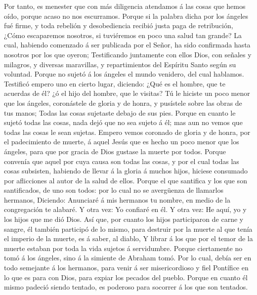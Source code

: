  Por tanto, es menester que con más diligencia atendamos á
las cosas que hemos oído, porque acaso no nos escurramos. 
Porque si la palabra dicha por los ángeles fué firme, y toda rebelión y
desobediencia recibió justa paga de retribución,  ¿Cómo
escaparemos nosotros, si tuviéremos en poco una salud tan grande? La
cual, habiendo comenzado á ser publicada por el Señor, ha sido
confirmada hasta nosotros por los que oyeron; 
Testificando juntamente con ellos Dios, con señales y milagros, y
diversas maravillas, y repartimientos del Espíritu Santo según su
voluntad.  Porque no sujetó á los ángeles el mundo
venidero, del cual hablamos.  Testificó empero uno en
cierto lugar, diciendo: ¿Qué es el hombre, que te acuerdas de él? ¿ó el
hijo del hombre, que le visitas?  Tú le hiciste un poco
menor que los ángeles, coronástele de gloria y de honra, y pusístele
sobre las obras de tus manos;  Todas las cosas sujetaste
debajo de sus pies. Porque en cuanto le sujetó todas las cosas, nada
dejó que no sea sujeto á él; mas aun no vemos que todas las cosas le
sean sujetas.  Empero vemos coronado de gloria y de honra,
por el padecimiento de muerte, á aquel Jesús que es hecho un poco menor
que los ángeles, para que por gracia de Dios gustase la muerte por
todos.  Porque convenía que aquel por cuya causa son
todas las cosas, y por el cual todas las cosas subsisten, habiendo de
llevar á la gloria á muchos hijos, hiciese consumado por aflicciones al
autor de la salud de ellos.  Porque el que santifica y
los que son santificados, de uno son todos: por lo cual no se avergüenza
de llamarlos hermanos,  Diciendo: Anunciaré á mis
hermanos tu nombre, en medio de la congregación te alabaré.
 Y otra vez: Yo confiaré en él. Y otra vez: He aquí, yo y
los hijos que me dió Dios.  Así que, por cuanto los hijos
participaron de carne y sangre, él también participó de lo mismo, para
destruir por la muerte al que tenía el imperio de la muerte, es á saber,
al diablo,  Y librar á los que por el temor de la muerte
estaban por toda la vida sujetos á servidumbre.  Porque
ciertamente no tomó á los ángeles, sino á la simiente de Abraham tomó.
 Por lo cual, debía ser en todo semejante á los hermanos,
para venir á ser misericordioso y fiel Pontífice en lo que es para con
Dios, para expiar los pecados del pueblo.  Porque en
cuanto él mismo padeció siendo tentado, es poderoso para socorrer á los
que son tentados.

